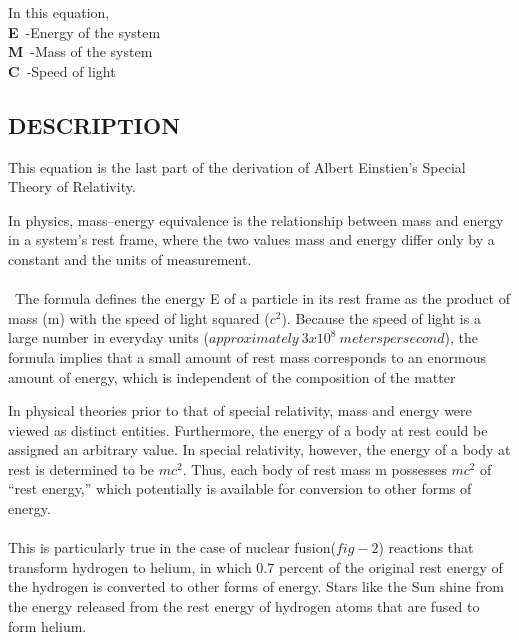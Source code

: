 \documentclass[a4paper, 12pt]{article}
\begin{document}
{\normalsize { In this equation,}\\
{\normalsize {\textbf{E}\ -Energy of the system}}\\
{\normalsize {\textbf{M}\ -Mass of the system}}\\
{\normalsize {\textbf{C}\ -Speed of light}}
\subsection{DESCRIPTION}

{\small {This equation is the last part of the derivation of Albert Einstien's Special Theory of Relativity.}}

{\small {In physics, mass–energy equivalence is the relationship between mass and energy in a system's rest frame, where the two values mass and energy differ only by a constant and the units of measurement.\\
\\
\ The formula defines the energy E of a particle in its rest frame as the product of mass (m) with the speed of light squared ($c^2$). Because the speed of light is a large number in everyday units ($approximately\ 3x10^8\ meters per second$), the formula implies that a small amount of rest mass corresponds to an enormous amount of energy, which is independent of the composition of the matter

In physical theories prior to that of special relativity, mass and energy were viewed as distinct entities. Furthermore, the energy of a body at rest could be assigned an arbitrary value. In special relativity, however, the energy of a body at rest is determined to be $mc^2$. Thus, each body of rest mass m possesses $mc^2$ of “rest energy,” which potentially is available for conversion to other forms of energy.\\
\\
 This is particularly true in the case of nuclear fusion($fig-2$) reactions that transform hydrogen to helium, in which 0.7 percent of the original rest energy of the hydrogen is converted to other forms of energy. Stars like the Sun shine from the energy released from the rest energy of hydrogen atoms that are fused to form helium.\\
 \\

}}}
\end{document}
